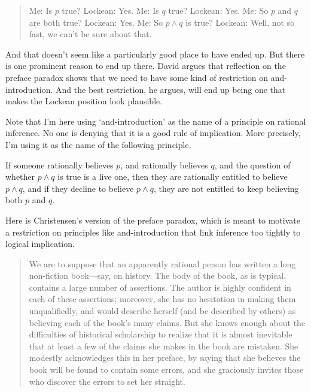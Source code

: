 \documentclass[11pt,]{book}
\providecommand{\tightlist}{%
  \setlength{\itemsep}{0pt}\setlength{\parskip}{0pt}}
\begin{document}
\begin{quote}
Me: Is \(p\) true?
Lockean: Yes.
Me: Is \(q\) true?
Lockean: Yes.
Me: So \(p\) and \(q\) are both true?
Lockean: Yes.
Me: So \(p \wedge q\) is true?
Lockean: Well, not so fast, we can't be sure about that.
\end{quote}

And that doesn't seem like a particularly good place to have ended up. But there is one prominent reason to end up there. David \citet{Christensen2005} argues that reflection on the preface paradox shows that we need to have some kind of restriction on and-introduction. And the best restriction, he argues, will end up being one that makes the Lockean position look plausible.

Note that I'm here using `and-introduction' as the name of a principle on rational inference. No one is denying that it is a good rule of implication. More precisely, I'm using it as the name of the following principle.

\begin{description}
\tightlist
\item[And-introduction]
If someone rationally believes \(p\), and rationally believes \(q\), and the question of whether \(p \wedge q\) is true is a live one, then they are rationally entitled to believe \(p \wedge q\), and if they decline to believe \(p \wedge q\), they are not entitled to keep believing both \(p\) and \(q\).
\end{description}

Here is Christensen's version of the preface paradox, which is meant to motivate a restriction on principles like and-introduction that link inference too tightly to logical implication.

\begin{quote}
We are to suppose that an apparently rational person has written a long non-fiction book---say, on history. The body of the book, as is typical, contains a large number of assertions. The author is highly confident in each of these assertions; moreover, she has no hesitation in making them unqualifiedly, and would describe herself (and be described by others) as believing each of the book's many claims. But she knows enough about the difficulties of historical scholarship to realize that it is almost inevitable that at least a few of the claims she makes in the book are mistaken. She modestly acknowledges this in her preface, by saying that she believes the book will be found to contain some errors, and she graciously invites those who discover the errors to set her straight. \citep[ 33-4]{Christensen2005}
\end{quote}
\end{document}
